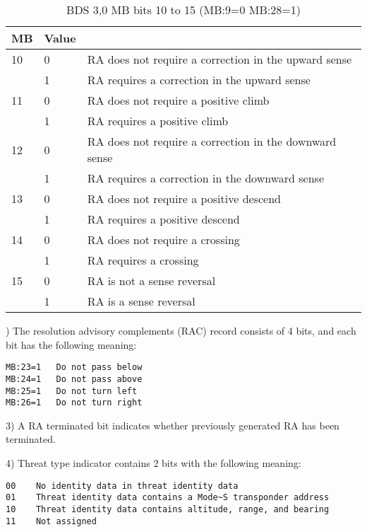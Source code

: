 \begin{table}[]
\centering
\caption{BDS 3,0 MB bits 10 to 15 (MB:9=0 MB:28=1)}
\label{tb:bds30_mb10-22_2}
\begin{tabular}{|l|l|l|}
\hline
\textbf{MB} & \textbf{Value} & \textbf{} \\ \hline
10 & 0 & RA does not require a correction in the upward sense \\ \hline
 & 1 & RA requires a correction in the upward sense \\ \hline
11 & 0 & RA does not require a positive climb \\ \hline
 & 1 & RA requires a positive climb \\ \hline
12 & 0 & RA does not require a correction in the downward sense \\ \hline
 & 1 & RA requires a correction in the downward sense \\ \hline
13 & 0 & RA does not require a positive descend \\ \hline
 & 1 & RA requires a positive descend \\ \hline
14 & 0 & RA does not require a crossing \\ \hline
 & 1 & RA requires a crossing \\ \hline
15 & 0 & RA is not a sense reversal \\ \hline
 & 1 & RA is a sense reversal \\ \hline
\end{tabular}
\end{table}

) The resolution advisory complements (RAC) record consists of 4 bits, and each bit has the following meaning:

\begin{verbatim}
MB:23=1   Do not pass below
MB:24=1   Do not pass above
MB:25=1   Do not turn left
MB:26=1   Do not turn right
\end{verbatim}


3) A RA terminated bit indicates whether previously generated RA has been terminated.


4) Threat type indicator contains 2 bits with the following meaning:

\begin{verbatim}
00    No identity data in threat identity data
01    Threat identity data contains a Mode~S transponder address
10    Threat identity data contains altitude, range, and bearing
11    Not assigned
\end{verbatim}

